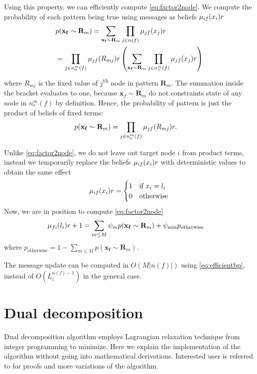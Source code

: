 \documentclass[letterpaper, 10 pt, conference]{ieeeconf} %
\newcommand{\vect}[1]{\mathbf{#1}}
\begin{document}
Using this property, we can efficiently compute \eqref{eq:factor2node}. We
compute the probability of each pattern being true using messages as beliefs
$\msg{i}{f}{x_i}{r}$
\begin{align}
  &p(\vect{x_f} \sim \vect{R}_m) = \sum_{\vect{x_f} \sim \vect{R}_m} \prod_{j \in n(f)}\msg{j}{f}{x_j}{r}\\
  &= \prod_{j \in n^m_0(f)}\msg{j}{f}{R_{mj}}{r}\left(\sum_{\vect{x_f} \sim \vect{R}_m}\prod_{j \in n^m_*(f)}\msg{j}{f}{x_j}{r}\right)
\end{align}
where $R_{mj}$ is the fixed value of $j$\textsuperscript{th} node in pattern
$\vect{R}_m$. The summation inside the bracket evaluates to one, because
$\vect{x}_f \sim \vect{R}_m$ do not constraints state of any node in $n^m_*(f)$
by definition. Hence, the probability of pattern is just the product of beliefs
of fixed terms:
\begin{align}
  p(\vect{x_f} \sim \vect{R}_m)&= \prod_{j \in n^m_0(f)}\msg{j}{f}{R_{mj}}{r}.
\end{align}

Unlike \eqref{eq:factor2node}, we do not leave out target node
$i$ from product terms, instead we temporarily replace the beliefs
$\msg{i}{f}{x_i}{r}$ with deterministic values to obtain the same effect
\begin{align}
  \msg{i}{f}{x_i}{r} = \begin{cases}
    1 & \text{if $x_i = l_i$}\\
    0 & \text{otherwise}
  \end{cases}
\end{align}
Now, we are in position to compute \eqref{eq:factor2node}
\begin{align}
  \msg{f}{i}{l_i}{r+1} &= \sum_{m \le M} \psi_m p(\vect{x_f} \sim \vect{R}_m)
  + \psi_{\text{min}} p_{\text{otherwise}}
  \label{eq:efficientbp}
\end{align}
where $p_{\text{otherwise}} = 1 - \sum_{m \le M}p(\vect{x_f} \sim \vect{R}_m)$.

The message update can be computed in $O(M|n(f)|)$ using \eqref{eq:efficientbp}, instead of $O(L_i^{n(f)-1})$ in the general case.

\section{Dual decomposition}
\renewcommand{\msg}[3]{\mu_{#1#2}(#3)}
\newcommand{\assign}{\leftarrow}
\newcommand{\Sx}{L_i}
Dual decomposition algorithm employs Lagrangian relaxation technique from
integer programming to minimize. Here we explain the implementation of the
algorithm without going into mathematical derivations. Interested user is
referred to
\cite{sontag2011introduction,jojic2010accelerated,komodakis2009beyond} for
proofs and more variations of the algorithm. 
\end{document}
